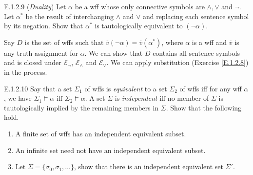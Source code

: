 \begin{exercise}{E.1.2.9}
  (\textit{Duality}) Let $\alpha$ be a wff whose only connective symbols are $\wedge,\vee$ and $\neg$. Let $\alpha^*$ be the result of interchanging $\wedge$ and $\vee$ and replacing each sentence symbol by its negation. Show that $\alpha^*$ is tautologically equivalent to $(\neg \alpha)$.
\end{exercise}

Say $D$ is the set of wffs such that $\overline{v}(\neg\alpha)=\overline{v}(\alpha^*)$, where $\alpha$ is a wff and $\overline{v}$ is any truth assignment for $\alpha$. We can show that $D$ contains all sentence symbols and is closed under $\mathcal{E}_\neg$, $\mathcal{E}_\wedge$ and $\mathcal{E}_\vee$. We can apply substitution (Exercise \ref{E.1.2.8}) in the process.

\begin{exercise}{E.1.2.10}
  Say that a set $\Sigma_1$ of wffs is \textit{equivalent} to a set $\Sigma_2$ of wffs iff for any wff $\alpha$, we have $\Sigma_1\vDash \alpha$ iff $\Sigma_2\vDash \alpha$. A set $\Sigma$ is \textit{independent} iff no member of $\Sigma$ is tautologically implied by the remaining members in $\Sigma$. Show that the following hold.\begin{enumerate}[label=(\alph*)]
    \item A finite set of wffs has an independent equivalent subset.
    \item An infinite set need not have an independent equivalent subset.
    \item Let $\Sigma=\{\sigma_0,\sigma_1,\dots\}$, show that there is an independent equivalent set $\Sigma'$.\qedhere
  \end{enumerate}
\end{exercise}

